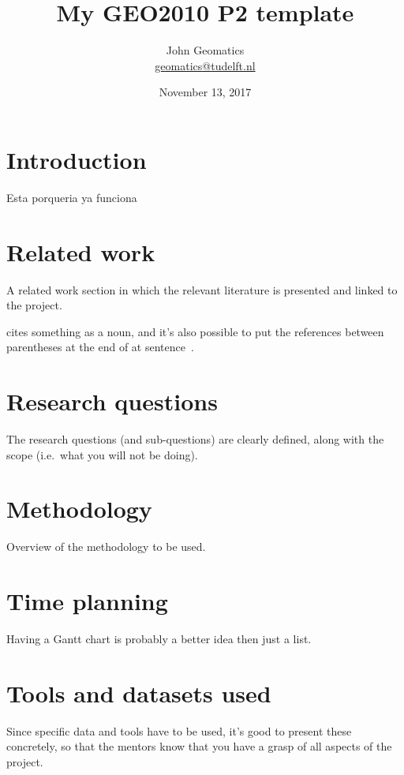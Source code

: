 \documentclass[a4paper,11pt]{scrartcl}
\title{My GEO2010 P2 template}
\author{John Geomatics\\ \url{geomatics@tudelft.nl}}
\date{November 13, 2017}
\newcommand{\ie}{i.e.}
\begin{document}
	
	\maketitle
	
	
	\section{Introduction}
Esta porqueria ya funciona
	
	\section{Related work}
	A related work section in which the relevant literature is presented and linked to the project.
	
	\citet{Delaunay34} cites something as a noun, and it's also possible to put the references between parentheses at the end of at sentence~\citep{Voronoi08}.
	
	\section{Research questions}
	The research questions (and sub-questions) are clearly defined, along with the scope (\ie\ what you will not be doing).
	
	
	\section{Methodology}
	Overview of the methodology to be used.
	
	\section{Time planning}
	Having a Gantt chart is probably a better idea then just a list.
	
	\section{Tools and datasets used}
	Since specific data and tools have to be used, it’s good to present these concretely, so that the mentors know that you have a grasp of all aspects of the project.
	
	
	
	
\end{document}
